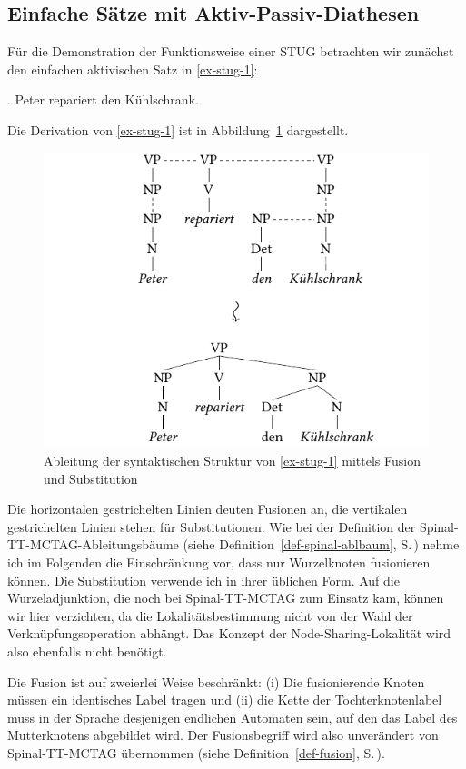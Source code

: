 \subsection{Einfache Sätze mit Aktiv-Passiv-Diathesen} \label{sec-stug-einfach}

Für die Demonstration der Funktionsweise einer STUG betrachten wir zunächst den einfachen aktivischen Satz in \ref{ex-stug-1}: 

\ex. \label{ex-stug-1} Peter repariert den Kühlschrank. 

Die Derivation von \ref{ex-stug-1} ist in Abbildung~\ref{fig-stug-1} dargestellt.
\begin{figure}[t]
\centering
\includegraphics{graphics/abb91.pdf}
\caption{\label{fig-stug-1}Ableitung der syntaktischen Struktur von \ref{ex-stug-1} mittels Fusion und Substitution}
\end{figure}
Die horizontalen gestrichelten Linien deuten Fusionen an, die vertikalen gestrichelten Linien stehen für Substitutionen. Wie bei der Definition der Spinal-TT-MCTAG-Ableitungsbäume (siehe Definition~\ref{def-spinal-ablbaum}, S.\,\pageref{def-spinal-ablbaum}) nehme ich im Folgenden die Einschränkung vor, dass nur Wurzelknoten fusionieren können. Die Substitution verwende ich in ihrer üblichen Form. Auf die Wurzeladjunktion, die noch bei Spinal-TT-MCTAG zum Einsatz kam, können wir hier verzichten, da die Lokalitätsbestimmung nicht von der Wahl der Verknüpfungsoperation abhängt. Das Konzept der Node-Sharing-Lokalität wird also ebenfalls nicht benötigt.

Die Fusion ist auf zweierlei Weise beschränkt: (i) Die fusionierende Knoten müssen ein identisches Label tragen und (ii) die Kette der Tochterknotenlabel muss in der Sprache desjenigen endlichen Automaten sein, auf den das Label des Mutterknotens abgebildet wird. Der Fusionsbegriff wird also unverändert von Spinal-TT-MCTAG übernommen (siehe Definition~\ref{def-fusion}, S.\,\pageref{def-fusion}).

